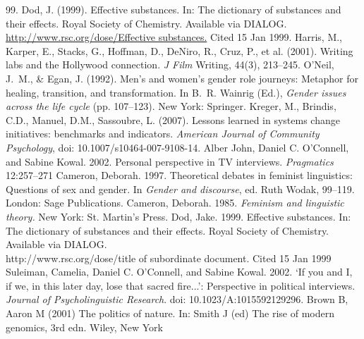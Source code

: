 \begin{thebibliography}{99.}
%
 Dod, J. (1999). Effective substances. In: The dictionary of substances and their effects. Royal Society of Chemistry. Available via DIALOG. \\
\url{http://www.rsc.org/dose/Effective substances.} Cited 15 Jan 1999.
%
 Harris, M., Karper, E., Stacks, G., Hoffman, D., DeNiro, R., Cruz, P., et al. (2001). Writing labs and the Hollywood connection. \textit{J Film} Writing, 44(3), 213--245.
%
 O'Neil, J.~M., \& Egan, J. (1992). Men's and women's gender role journeys: Metaphor for healing, transition, and transformation. In B.~R. Wainrig (Ed.), \textit{Gender issues across the life cycle} (pp. 107--123). New York: Springer.
%
Kreger, M., Brindis, C.D., Manuel, D.M., Sassoubre, L. (2007). Lessons learned in systems change initiatives: benchmarks and indicators. \textit{American Journal of Community Psychology}, doi: 10.1007/s10464-007-9108-14.
%
%
%
%
 Alber John, Daniel C. O'Connell, and Sabine Kowal. 2002. Personal perspective in TV interviews. \textit{Pragmatics} 12:257--271
%
 Cameron, Deborah. 1997. Theoretical debates in feminist linguistics: Questions of sex and gender. In \textit{Gender and discourse}, ed. Ruth Wodak, 99--119. London: Sage Publications.
%
 Cameron, Deborah. 1985. \textit{Feminism and linguistic theory.} New York: St. Martin's Press.
%
 Dod, Jake. 1999. Effective substances. In: The dictionary of substances and their effects. Royal Society of Chemistry. Available via DIALOG. \\
http://www.rsc.org/dose/title of subordinate document. Cited 15 Jan 1999
%
 Suleiman, Camelia, Daniel C. O'Connell, and Sabine Kowal. 2002. `If you and I, if we, in this later day, lose that sacred fire...': Perspective in political interviews. \textit{Journal of Psycholinguistic Research}. doi: 10.1023/A:1015592129296.
%
%
%
%
%
 Brown B, Aaron M (2001) The politics of nature. In: Smith J (ed) The rise of modern genomics, 3rd edn. Wiley, New York 

\end{thebibliography}
